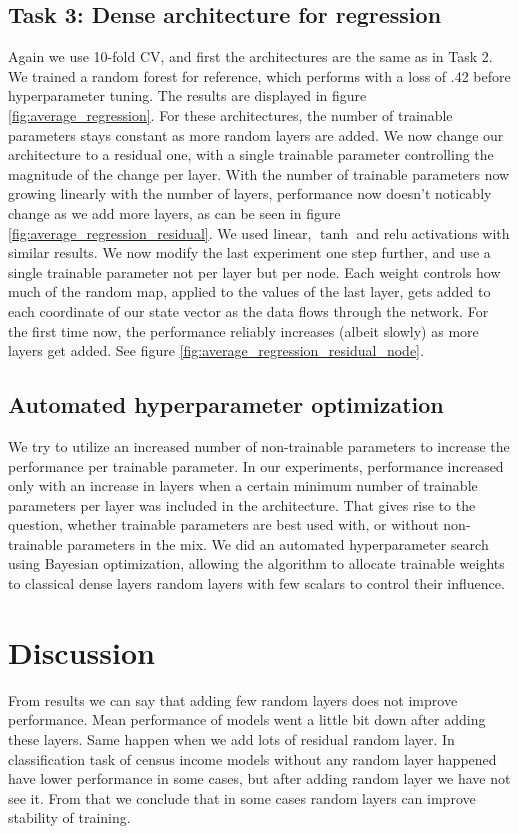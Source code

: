 \documentclass[]{article}
\begin{document}
\begin{multicols}{2}
	\subsection*{Task 3: Dense architecture for regression}
	Again we use 10-fold CV, and first the architectures are the same as in Task 2. We trained a random forest for reference, which performs with a loss of .42 before hyperparameter tuning. The results are displayed in figure \ref{fig:average_regression}. For these architectures, the number of trainable parameters stays constant as more random layers are added. We now change our architecture to a residual one, with a single trainable parameter controlling the magnitude of the change per layer. With the number of trainable parameters now growing linearly with the number of layers, performance now doesn't noticably change as we add more layers, as can be seen in figure \ref{fig:average_regression_residual}. We used linear, $\tanh$ and relu activations with similar results. We now modify the last experiment one step further, and use a single trainable parameter not per layer but per node. Each weight controls how much of the random map, applied to the values of the last layer, gets added to each coordinate of our state vector as the data flows through the network. For the first time now, the performance reliably increases (albeit slowly) as more layers get added. See figure \ref{fig:average_regression_residual_node}.
	
	\subsection*{Automated hyperparameter optimization}
	We try to utilize an increased number of non-trainable parameters to increase the performance per trainable parameter. In our experiments, performance increased only with an increase in layers when a certain minimum number of trainable parameters per layer was included in the architecture. That gives rise to the question, whether trainable parameters are best used with, or without non-trainable parameters in the mix. We did an automated hyperparameter search using Bayesian optimization, allowing the algorithm to allocate trainable weights to classical dense layers random layers with few scalars to control their influence.
	
	
	\section{Discussion}
	From results we can say that adding few random layers does not improve performance. Mean performance of models went a little bit down after adding these layers. Same happen when we add lots of residual random layer. In classification task of census income models without any random layer happened have lower performance in some cases, but after adding random layer we have not see it. From that we conclude that in some cases random layers can improve stability of training.
	

\end{multicols}
\end{document}
